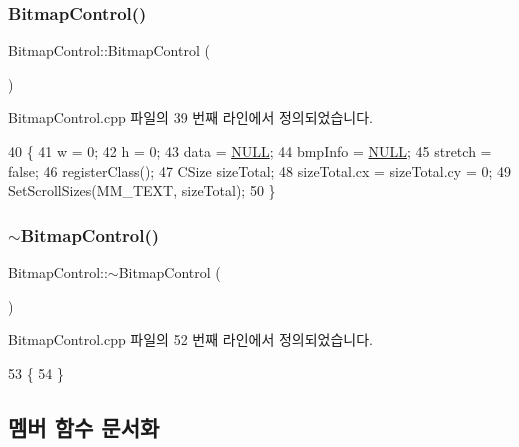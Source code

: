 \subsubsection{\texorpdfstring{Bitmap\+Control()}{BitmapControl()}}
{\footnotesize\ttfamily Bitmap\+Control\+::\+Bitmap\+Control (\begin{DoxyParamCaption}{ }\end{DoxyParamCaption})}



Bitmap\+Control.\+cpp 파일의 39 번째 라인에서 정의되었습니다.


\begin{DoxyCode}
40 \{
41   w = 0;
42   h = 0;
43   data = \mbox{\hyperlink{getopt1_8c_a070d2ce7b6bb7e5c05602aa8c308d0c4}{NULL}};
44   bmpInfo = \mbox{\hyperlink{getopt1_8c_a070d2ce7b6bb7e5c05602aa8c308d0c4}{NULL}};
45   stretch = \textcolor{keyword}{false};
46   registerClass();
47   CSize sizeTotal;
48   sizeTotal.cx = sizeTotal.cy = 0;
49   SetScrollSizes(MM\_TEXT, sizeTotal);
50 \}
\end{DoxyCode}
\mbox{\label{class_bitmap_control_ae76af69d5ae1085e93213530ca913283}} 
\subsubsection{\texorpdfstring{$\sim$\+Bitmap\+Control()}{~BitmapControl()}}
{\footnotesize\ttfamily Bitmap\+Control\+::$\sim$\+Bitmap\+Control (\begin{DoxyParamCaption}{ }\end{DoxyParamCaption})\hspace{0.3cm}{\ttfamily [virtual]}}



Bitmap\+Control.\+cpp 파일의 52 번째 라인에서 정의되었습니다.


\begin{DoxyCode}
53 \{
54 \}
\end{DoxyCode}


\subsection{멤버 함수 문서화}
\mbox{\label{class_bitmap_control_a1d3cff9a3b57dd7558d678177dcf4b5c}} 
